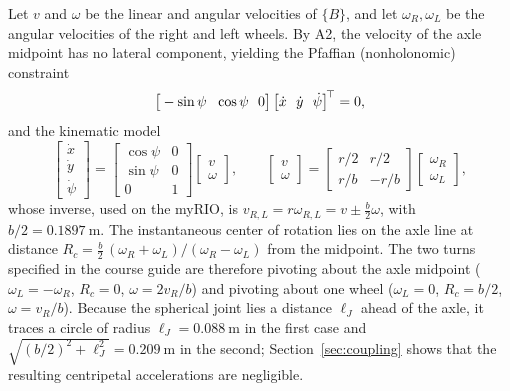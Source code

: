 Let $v$ and $\omega$ be the linear and angular velocities of $\{B\}$, and let $\omega_R,\omega_L$ be the angular velocities of the right and left wheels. By A2, the velocity of the axle midpoint has no lateral component, yielding the Pfaffian (nonholonomic) constraint
\begin{equation}
  \big[-\sin\psi\ \ \cos\psi\ \ 0\big]\,\big[\dot x\ \ \dot y\ \ \dot\psi\big]^{\!\top}=0,
  \label{eq:pfaff}
\end{equation}
and the kinematic model \cite{siegwart2011,campion1996}
\begin{equation}
  \begin{bmatrix}\dot x\\ \dot y\\ \dot\psi\end{bmatrix}=\begin{bmatrix}\cos\psi&0\\ \sin\psi&0\\ 0&1\end{bmatrix}\begin{bmatrix}v\\ \omega\end{bmatrix},\qquad
  \begin{bmatrix}v\\ \omega\end{bmatrix}=\begin{bmatrix}r/2 & r/2\\ r/b & -r/b\end{bmatrix}\begin{bmatrix}\omega_R\\ \omega_L\end{bmatrix},
  \label{eq:diff}
\end{equation}
whose inverse, used on the myRIO, is $v_{R,L}=r\omega_{R,L}=v\pm\tfrac{b}{2}\omega$, with $b/2=\SI{0.1897}{\metre}$. The instantaneous center of rotation lies on the axle line at distance $R_c=\tfrac{b}{2}\,(\omega_R+\omega_L)/(\omega_R-\omega_L)$ from the midpoint. The two turns specified in the course guide are therefore pivoting about the axle midpoint ($\omega_L=-\omega_R$, $R_c=0$, $\omega=2v_R/b$) and pivoting about one wheel ($\omega_L=0$, $R_c=b/2$, $\omega=v_R/b$). Because the spherical joint lies a distance $\ell_J$ ahead of the axle, it traces a circle of radius $\ell_J=\SI{0.088}{\metre}$ in the first case and $\sqrt{(b/2)^2+\ell_J^2}=\SI{0.209}{\metre}$ in the second; Section~\ref{sec:coupling} shows that the resulting centripetal accelerations are negligible.

